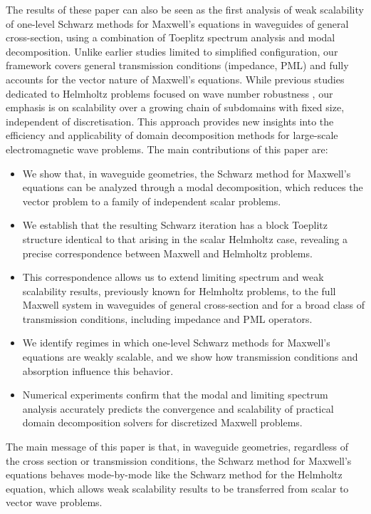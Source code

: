 \documentclass[smallextended]{svjour3}       %
\begin{document}
{The results of these paper can also be seen as the first analysis of weak scalability of one-level Schwarz methods for Maxwell’s equations in waveguides of general cross-section, using a combination of Toeplitz spectrum analysis and modal decomposition. Unlike earlier studies limited to simplified configuration, our framework covers general transmission conditions (impedance, PML) and fully accounts for the vector nature of Maxwell’s equations.}
While previous studies dedicated to Helmholtz problems focused on wave number robustness \cite{Gong:2020:DDP,Graham:2020:DDI}, our emphasis is on scalability over a growing chain of subdomains with fixed size, independent of discretisation. This approach provides new insights into the efficiency and applicability of domain decomposition methods for large-scale electromagnetic wave problems. The main contributions of this paper are:
\begin{itemize}
\item We show that, in waveguide geometries, the Schwarz method for Maxwell’s equations can be analyzed through a modal decomposition, which reduces the vector problem to a family of independent scalar problems.

\item We establish that the resulting Schwarz iteration has a block Toeplitz structure identical to that arising in the scalar Helmholtz case, revealing a precise correspondence between Maxwell and Helmholtz problems.

\item This correspondence allows us to extend limiting spectrum and weak scalability results, previously known for Helmholtz problems, to the full Maxwell system in waveguides of general cross-section and for a broad class of transmission conditions, including impedance and PML operators.

\item We identify regimes in which one-level Schwarz methods for Maxwell’s equations are weakly scalable, and we show how transmission conditions and absorption influence this behavior.

\item Numerical experiments confirm that the modal and limiting spectrum analysis accurately predicts the convergence and scalability of practical domain decomposition solvers for discretized Maxwell problems.
\end{itemize}
The main message of this paper is that, in waveguide geometries, regardless of the cross section or transmission conditions, the Schwarz method for Maxwell’s equations behaves mode-by-mode like the Schwarz method for the Helmholtz equation, which allows weak scalability results to be transferred from scalar to vector wave problems.
\end{document}
